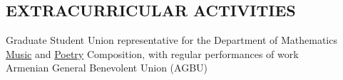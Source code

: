 \documentclass{resume}
\begin{document}
\begin{resume}
	\section{EXTRACURRICULAR ACTIVITIES}
	\vspace{0.05in}
    Graduate Student Union representative for the Department of Mathematics\\
    \href{http://davidkarapetyan.com/music.php}{Music} and
    \href{http://davidkarapetyan.com/poetry.php}{Poetry} Composition, with regular
    performances of work\\
	Armenian General Benevolent Union (AGBU)\\

\end{resume}
\end{document}
